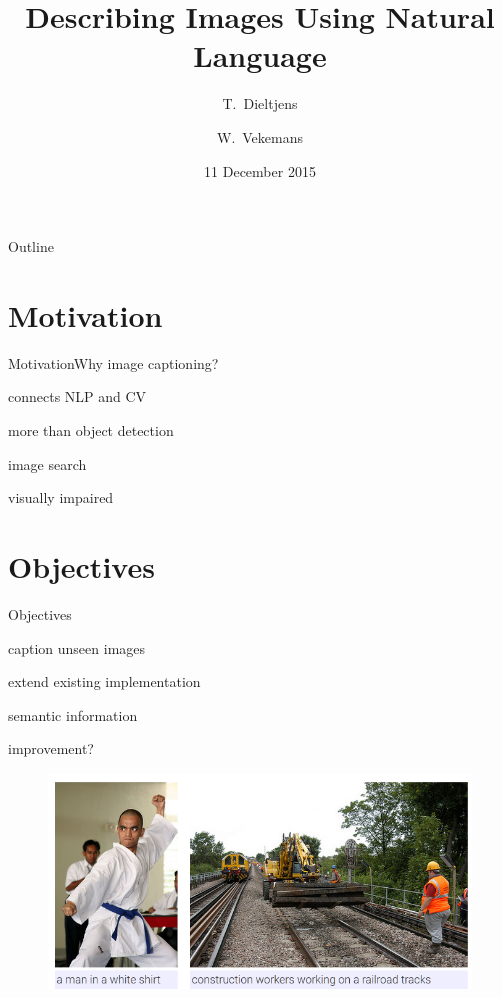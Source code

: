 \documentclass[16pt]{beamer}
\title{Describing Images Using Natural Language}
\subtitle{}
\author{T.~Dieltjens \and W.~Vekemans}
\institute[Universities of Somewhere and Elsewhere] %
{
  \inst{}%
  Department of Computer Science\\
  KULeuven
  }
\date{11 December 2015}
\newenvironment{wideitemize}{\itemize\addtolength{\itemsep}{10pt}}{\enditemize}
\begin{document}
\begin{frame}
  \titlepage
\end{frame}

\begin{frame}{Outline}
  \tableofcontents[subsubsectionstyle=hide/hide]
\end{frame}

\section{Motivation} %
\begin{frame}{Motivation}{Why image captioning?}
\begin{wideitemize}
\item connects NLP and CV
\item more than object detection
\item image search
\item visually impaired
\end{wideitemize}
\end{frame}
\section{Objectives} %
\begin{frame}{Objectives}
\begin{wideitemize}
\item caption unseen images
\item extend existing implementation
\item semantic information
\item improvement?
\begin{figure}[tb]
           \centering
           \includegraphics[width=\linewidth]{caption.png}
           \end{figure}
\end{wideitemize}


\end{frame}
\end{document}
